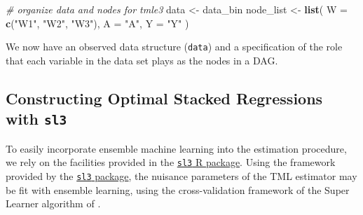 \documentclass[12pt, krantz2,]{book}
\newenvironment{Shaded}{\begin{snugshade}}{\end{snugshade}}
\newcommand{\CommentTok}[1]{\textcolor[rgb]{0.56,0.35,0.01}{\textit{#1}}}
\newcommand{\DataTypeTok}[1]{\textcolor[rgb]{0.13,0.29,0.53}{#1}}
\newcommand{\KeywordTok}[1]{\textcolor[rgb]{0.13,0.29,0.53}{\textbf{#1}}}
\newcommand{\NormalTok}[1]{#1}
\newcommand{\StringTok}[1]{\textcolor[rgb]{0.31,0.60,0.02}{#1}}
\theoremstyle{definition}
\theoremstyle{definition}
\theoremstyle{definition}
\newcommand{\1}{\mathbbm{1}}
\begin{document}
\begin{Shaded}
\begin{Highlighting}[]
\CommentTok{# organize data and nodes for tmle3}
\NormalTok{data <-}\StringTok{ }\NormalTok{data_bin}
\NormalTok{node_list <-}\StringTok{ }\KeywordTok{list}\NormalTok{(}
  \DataTypeTok{W =} \KeywordTok{c}\NormalTok{(}\StringTok{"W1"}\NormalTok{, }\StringTok{"W2"}\NormalTok{, }\StringTok{"W3"}\NormalTok{),}
  \DataTypeTok{A =} \StringTok{"A"}\NormalTok{,}
  \DataTypeTok{Y =} \StringTok{"Y"}
\NormalTok{)}
\end{Highlighting}
\end{Shaded}

We now have an observed data structure (\texttt{data}) and a specification of the role
that each variable in the data set plays as the nodes in a DAG.

\hypertarget{constructing-optimal-stacked-regressions-with-sl3}{%
\subsection{\texorpdfstring{Constructing Optimal Stacked Regressions with \texttt{sl3}}{Constructing Optimal Stacked Regressions with sl3}}\label{constructing-optimal-stacked-regressions-with-sl3}}

To easily incorporate ensemble machine learning into the estimation procedure,
we rely on the facilities provided in the \href{https://tlverse.org/sl3}{\texttt{sl3} R
package}. Using the framework provided by the \href{https://tlverse.org/sl3}{\texttt{sl3}
package}, the nuisance parameters of the TML estimator
may be fit with ensemble learning, using the cross-validation framework of the
Super Learner algorithm of \citet{vdl2007super}.
\end{document}
